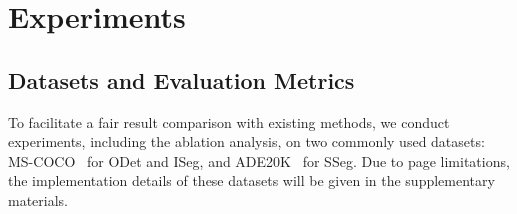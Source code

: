 \section{Experiments}
\subsection{Datasets and Evaluation Metrics}
\label{sec4:1}
 To facilitate a fair result comparison with existing methods, we conduct experiments, including the ablation analysis, on two commonly used datasets: MS-COCO~\citep{caesar2018coco} for ODet and ISeg, and ADE20K~\citep{zhou2017scene} for SSeg. Due to page limitations, the implementation details of these datasets will be given in the supplementary materials. 


